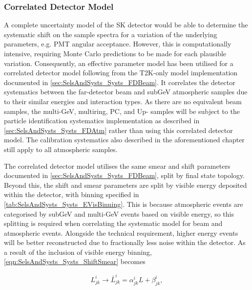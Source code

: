 \subsubsection{Correlated Detector Model}
\label{sec:SelsAndSysts_Systs_Correlated}

A complete uncertainty model of the SK detector would be able to determine the systematic shift on the sample spectra for a variation of the underlying parameters, e.g. PMT angular acceptance. However, this is computationally intensive, requiring Monte Carlo predictions to be made for each plausible variation. Consequently, an effective parameter model has been utilised for a correlated detector model following from the T2K-only model implementation documented in \autoref{sec:SelsAndSysts_Systs_FDBeam}. It correlates the detector systematics between the far-detector beam and subGeV atmospheric samples due to their similar energies and interaction types. As there are no equivalent beam samples, the multi-GeV, multiring, PC, and Up-\quickmath{\mu} samples will be subject to the particle identification systematics implementation as described in \autoref{sec:SelsAndSysts_Systs_FDAtm} rather than using this correlated detector model. The calibration systematics also described in the aforementioned chapter still apply to all atmospheric samples.

The correlated detector model utilises the same smear and shift parameters documented in \autoref{sec:SelsAndSysts_Systs_FDBeam}, split by final state topology. Beyond this, the shift and smear parameters are split by visible energy deposited within the detector, with binning specified in \autoref{tab:SelsAndSysts_Systs_EVisBinning}. This is because atmospheric events are categorised by subGeV and multi-GeV events based on visible energy, so this splitting is required when correlating the systematic model for beam and atmospheric events. Alongside the technical requirement, higher energy events will be better reconstructed due to fractionally less noise within the detector. As a result of the inclusion of visible energy binning, \autoref{eqn:SelsAndSysts_Systs_ShiftSmear} becomes

\begin{equation}
  \label{eqn:SelsAndSysts_Systs_ShiftSmearWithEVis}
  L^{i}_{jk} \rightarrow \bar{L}^{i}_{jk} = \alpha^{i}_{jk} L + \beta^{i}_{jk},
\end{equation}

